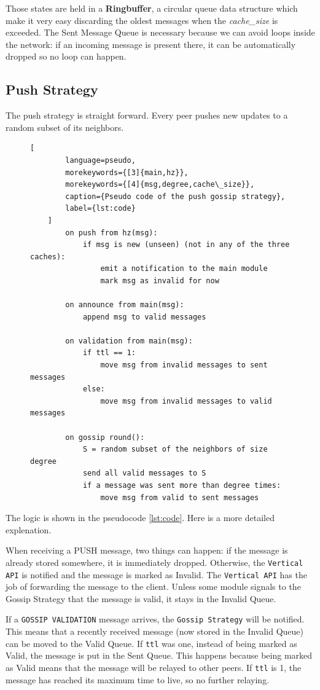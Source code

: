 \documentclass[a4paper,english,10pt,NET]{tumarticle}
\begin{document}
Those states are held in a \textbf{Ringbuffer}, a circular queue data structure which make it very easy discarding the oldest messages when the \textit{cache\_size} is exceeded. The Sent Message Queue is necessary because we can avoid loops inside the network: if an incoming message is present there, it can be automatically dropped so no loop can happen.

\subsection{Push Strategy} 
The push strategy is straight forward.
Every peer pushes new updates to a random subset of its neighbors. 

\begin{figure}
	\centering
\begin{minipage}{0.50\linewidth}
	\begin{lstlisting}[
		language=pseudo,
		morekeywords={[3]{main,hz}},
		morekeywords={[4]{msg,degree,cache\_size}},
		caption={Pseudo code of the push gossip strategy},
		label={lst:code}
	]
		on push from hz(msg):
			if msg is new (unseen) (not in any of the three caches):
				emit a notification to the main module
				mark msg as invalid for now

		on announce from main(msg):
			append msg to valid messages

		on validation from main(msg):
			if ttl == 1:
				move msg from invalid messages to sent messages
			else:
				move msg from invalid messages to valid messages

		on gossip round():
			S = random subset of the neighbors of size degree
			send all valid messages to S
			if a message was sent more than degree times:
				move msg from valid to sent messages
	\end{lstlisting}
\end{minipage}
\end{figure}

The logic is shown in the pseudocode \ref{lst:code}. Here is a more detailed explenation.

When receiving a PUSH message, two things can happen: if the message is already stored somewhere, it is immediately dropped. Otherwise, the \texttt{Vertical API} is notified and the message is marked as Invalid. The \texttt{Vertical API} has the job of forwarding the message to the client. Unless some module signals to the Gossip Strategy that the message is valid, it stays in the Invalid Queue.

If a \texttt{GOSSIP VALIDATION} message arrives, the \texttt{Gossip Strategy} will be notified. This means that a recently received message (now stored in the Invalid Queue) can be moved to the Valid Queue. If \texttt{ttl} was one, instead of being marked as Valid, the message is put in the Sent Queue. This happens because being marked as Valid means that the message will be relayed to other peers. If \texttt{ttl} is 1, the message has reached its maximum time to live, so no further relaying.
\end{document}
